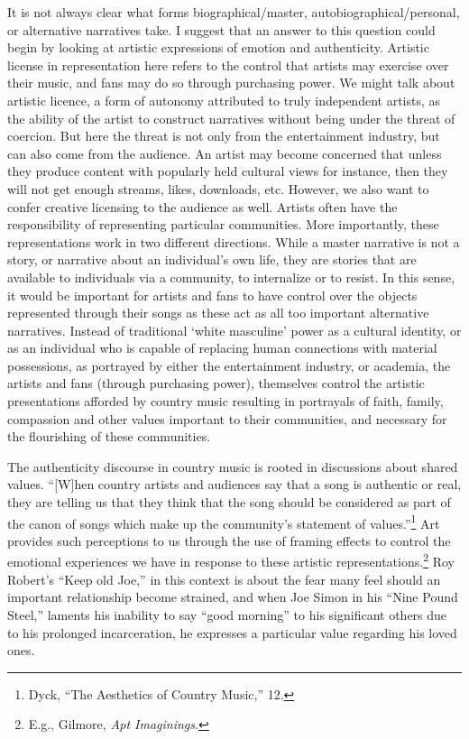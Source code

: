 \documentclass[phdthesis,12pt,final]{wuthesis}
\theoremstyle{definition}
\theoremstyle{definition}
\theoremstyle{definition}
\theoremstyle{definition}
\theoremstyle{remark}
\begin{document}
It is not always clear what forms biographical/master, autobiographical/personal, or alternative narratives take. I suggest that an answer to this question could begin by looking at artistic expressions of emotion and authenticity. Artistic license in representation here refers to the control that artists may exercise over their music, and fans may do so through purchasing power. We might talk about artistic licence, a form of autonomy attributed to truly independent artists, as the ability of the artist to construct narratives without being under the threat of coercion. But here the threat is not only from the entertainment industry, but can also come from the audience. An artist may become concerned that unless they produce content with popularly held cultural views for instance, then they will not get enough streams, likes, downloads, etc. However, we also want to confer creative licensing to the audience as well. Artists often have the responsibility of representing particular communities. More importantly, these representations work in two different directions. While a master narrative is not a story, or narrative about an individual's own life, they are stories that are available to individuals via a community, to internalize or to resist. In this sense, it would be important for artists and fans to have control over the objects represented through their songs as these act as all too important alternative narratives. Instead of traditional `white masculine' power as a cultural identity, or as an individual who is capable of replacing human connections with material possessions, as portrayed by either the entertainment industry, or academia, the artists and fans (through purchasing power), themselves control the artistic presentations afforded by country music resulting in portrayals of faith, family, compassion and other values important to their communities, and necessary for the flourishing of these communities.

The authenticity discourse in country music is rooted in discussions about shared values. ``{[}W{]}hen country artists and audiences say that a song is authentic or real, they are telling us that they think that the song should be considered as part of the canon of songs which make up the community's statement of values.''\footnote{Dyck, {``The Aesthetics of Country Music,''} 12.} Art provides such perceptions to us through the use of framing effects to control the emotional experiences we have in response to these artistic representations.\footnote{E.g., Gilmore, \emph{Apt {Imaginings}}.} Roy Robert's ``Keep old Joe,'' in this context is about the fear many feel should an important relationship become strained, and when Joe Simon in his ``Nine Pound Steel,'' laments his inability to say ``good morning'' to his significant others due to his prolonged incarceration, he expresses a particular value regarding his loved ones.
\end{document}
